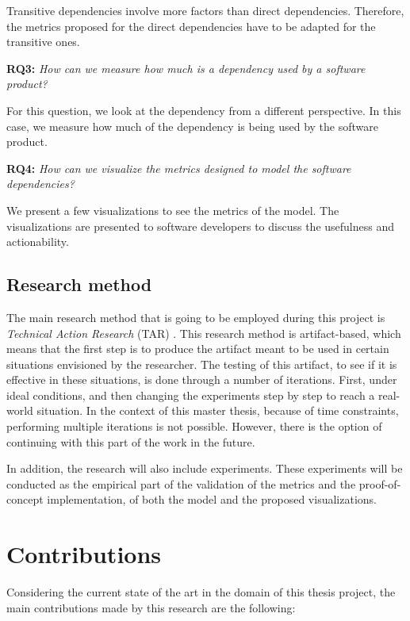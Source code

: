 \blankls
Transitive dependencies involve more factors than direct dependencies. Therefore, the metrics proposed for the direct dependencies have to be adapted for the transitive ones.

\blankl
\textbf{RQ3:} \textit{How can we measure how much is a dependency used by a software product?}

\blankls
For this question, we look at the dependency from a different perspective. In this case, we measure how much of the dependency is being used by the software product.

\blankl
\textbf{RQ4:} \textit{How can we visualize the metrics designed to model the software dependencies?}

\blankls
We present a few visualizations to see the metrics of the model. The visualizations are presented to software developers to discuss the usefulness and actionability.

\subsection{Research method}
The main research method that is going to be employed during this project is \textit{Technical Action Research} (TAR) \cite{wieringa2012technical}.
This research method is artifact-based, which means that the first step is to produce the artifact meant to be used in certain situations envisioned by the researcher. The testing of this artifact, to see if it is effective in these situations, is done through a number of iterations. First, under ideal conditions, and then changing the experiments step by step to reach a real-world situation. In the context of this master thesis, because of time constraints, performing multiple iterations is not possible. However, there is the option of continuing with this part of the work in the future.

\blankl
In addition, the research will also include experiments. These experiments will be conducted as the empirical part of the validation of the metrics and the proof-of-concept implementation, of both the model and the proposed visualizations.

\section{Contributions}
Considering the current state of the art in the domain of this thesis project, the main contributions made by this research are the following:

